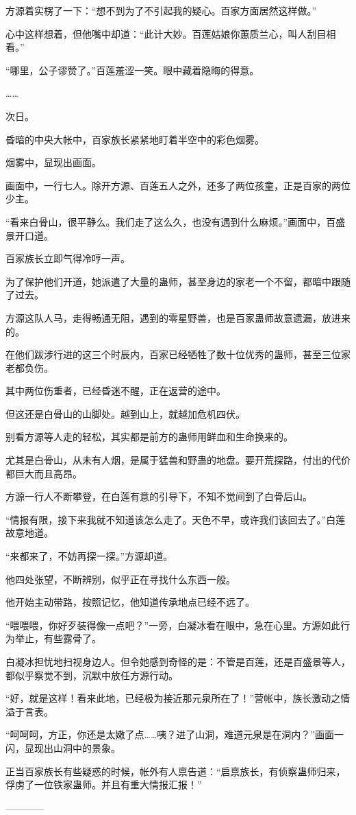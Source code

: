 \begin{this_body}
方源着实楞了一下：“想不到为了不引起我的疑心。百家方面居然这样做。”

心中这样想着，但他嘴中却道：“此计大妙。百莲姑娘你蕙质兰心，叫人刮目相看。”

“哪里，公子谬赞了。”百莲羞涩一笑。眼中藏着隐晦的得意。

……

次日。

昏暗的中央大帐中，百家族长紧紧地盯着半空中的彩色烟雾。

烟雾中，显现出画面。

画面中，一行七人。除开方源、百莲五人之外，还多了两位孩童，正是百家的两位少主。

“看来白骨山，很平静么。我们走了这么久，也没有遇到什么麻烦。”画面中，百盛景开口道。

百家族长立即气得冷哼一声。

为了保护他们开道，她派遣了大量的蛊师，甚至身边的家老一个不留，都暗中跟随了过去。

方源这队人马，走得畅通无阻，遇到的零星野兽，也是百家蛊师故意遗漏，放进来的。

在他们跋涉行进的这三个时辰内，百家已经牺牲了数十位优秀的蛊师，甚至三位家老都负伤。

其中两位伤重者，已经昏迷不醒，正在返营的途中。

但这还是白骨山的山脚处。越到山上，就越加危机四伏。

别看方源等人走的轻松，其实都是前方的蛊师用鲜血和生命换来的。

尤其是白骨山，从未有人烟，是属于猛兽和野蛊的地盘。要开荒探路，付出的代价都巨大而且高昂。

方源一行人不断攀登，在白莲有意的引导下，不知不觉间到了白骨后山。

“情报有限，接下来我就不知道该怎么走了。天色不早，或许我们该回去了。”白莲故意地道。

“来都来了，不妨再探一探。”方源却道。

他四处张望，不断辨别，似乎正在寻找什么东西一般。

他开始主动带路，按照记忆，他知道传承地点已经不远了。

“喂喂喂，你好歹装得像一点吧？”一旁，白凝冰看在眼中，急在心里。方源如此行为举止，有些露骨了。

白凝冰担忧地扫视身边人。但令她感到奇怪的是：不管是百莲，还是百盛景等人，都似乎察觉不到，沉默中放任方源行动。

“好，就是这样！看来此地，已经极为接近那元泉所在了！”营帐中，族长激动之情溢于言表。

“呵呵呵，方正，你还是太嫩了点……咦？进了山洞，难道元泉是在洞内？”画面一闪，显现出山洞中的景象。

正当百家族长有些疑惑的时候，帐外有人禀告道：“启禀族长，有侦察蛊师归来，俘虏了一位铁家蛊师。并且有重大情报汇报！”

------------

\end{this_body}

